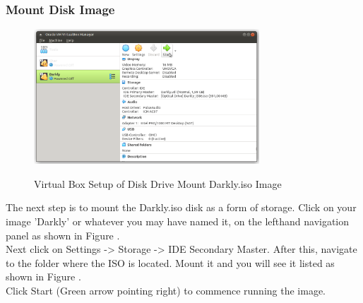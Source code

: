 \subsubsection{Mount Disk Image}
\begin{figure}[!htb]
    \centering
    \includegraphics[width=0.752\textwidth]{images/00-07.png}\\[0cm]  
    \caption[Windows Virtual Box]{Virtual Box Setup of Disk Drive Mount Darkly.iso Image}
    \label{fig:00-07 - Windows Virtual Box ISO Mount} 
\end{figure}
The next step is to mount the Darkly.iso disk as a form of storage. Click on
your image 'Darkly' or whatever you may have named it, on the lefthand navigation
panel as shown in Figure .\\

Next click on Settings -> Storage -> IDE Secondary Master. After this, navigate
to the folder where the ISO is located. Mount it and you will see it listed
as shown in Figure .\\

Click Start (Green arrow pointing right) to commence running the image.

